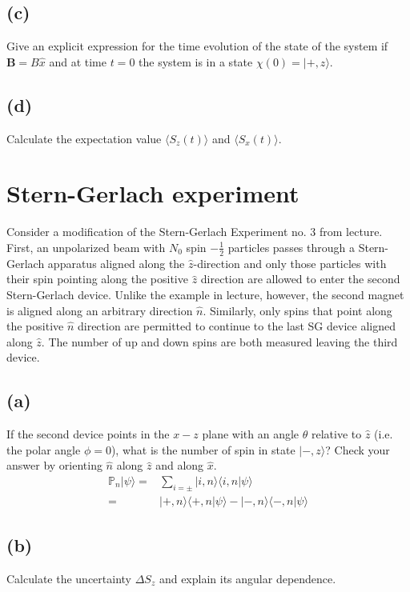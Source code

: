 \documentclass[12pt, a4paper]{article}
\begin{document}
\subsection*{(c)}
Give an explicit expression for the time evolution of the state of the system if $\textbf{B} = B\hat{x}$ and at time $t = 0$ the system is in a state $\chi(0) = |+, z\rangle$.

\subsection*{(d)}
Calculate the expectation value $\langle S_z(t)\rangle$ and $\langle S_x(t)\rangle$.



\section{Stern-Gerlach experiment}
Consider a modification of the Stern-Gerlach Experiment no. 3 from lecture. First, an unpolarized beam  with $N_0$ spin $-\frac{1}{2}$ particles passes through a Stern-Gerlach apparatus aligned along the $\hat{z}$-direction and only those particles with their spin pointing along the positive $\hat{z}$ direction are allowed to enter the second Stern-Gerlach device. Unlike the example in lecture, however, the second magnet is aligned along an arbitrary direction $\hat{n}$. Similarly, only spins that point along the positive $\hat{n}$ direction are permitted to continue to the last SG device aligned along $\hat{z}$. The number of up and down spins are both measured leaving the third device.

\subsection*{(a)}
If the second device points in the $x - z$ plane with an angle $\theta$ relative to $\hat{z}$ (i.e. the polar angle $\phi =0$), what is the number of spin in state $|-,z\rangle$? Check your answer by orienting $\hat{n}$ along $\hat{z}$ and along $\hat{x}$.
\begin{align*}
\mathbb{P}_n|\psi\rangle =& \sum_{i=\pm} |i,n\rangle\langle i,n |\psi\rangle
\\
=& |+,n\rangle\langle+,n|\psi\rangle - |-,n\rangle\langle -, n|\psi\rangle
\end{align*}

\subsection*{(b)}
Calculate the uncertainty $\Delta S_z$ and explain its angular dependence.
\end{document}
